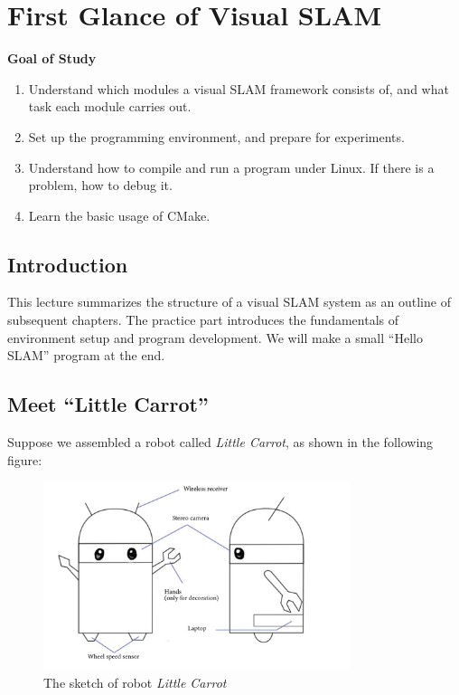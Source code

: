 \chapter{First Glance of Visual SLAM}
\begin{mdframed}
	\textbf{Goal of Study}
	\begin{enumerate}[labelindent=0em,leftmargin=1.5em]
		\item Understand which modules a visual SLAM framework consists of, and what task each module carries out.
		\item Set up the programming environment, and prepare for experiments.
		\item Understand how to compile and run a program under Linux. If there is a problem, how to debug it.
		\item Learn the basic usage of CMake.
	\end{enumerate}
\end{mdframed}

\newpage
\section{Introduction}

This lecture summarizes the structure of a visual SLAM system as an outline of subsequent chapters. The practice part introduces the fundamentals of environment setup and program development. We will make a small ``Hello SLAM'' program at the end.

\section{Meet ``Little Carrot''}

Suppose we assembled a robot called \emph{Little Carrot}, as shown in the following figure:

\begin{figure}
	\centering
	\includegraphics[width=0.8\textwidth]{resources/whatIsSLAM/carrot.pdf}
	\caption{The sketch of robot \emph{Little Carrot}}
\end{figure}

